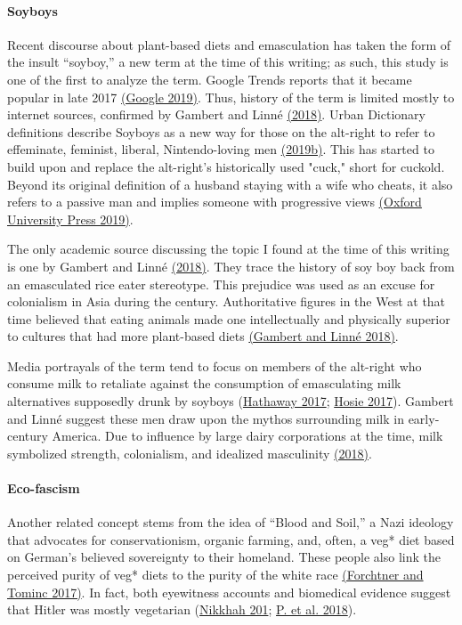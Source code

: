 \documentclass[twoside]{report}
\begin{document}
\paragraph{Soyboys}

Recent discourse about plant-based diets and emasculation has taken the
form of the insult ``soyboy,'' a new term at the time of this
writing; as such, this study is one of the first to analyze the term.
Google Trends reports that it became popular in late 2017 \hyperlink{google}{(Google 2019)}. Thus, history of the term is limited mostly to internet sources, confirmed by Gambert and Linné \hyperlink{gambert}{(2018)}. Urban Dictionary definitions describe Soyboys as a new way for those on the alt-right to refer to effeminate, feminist, liberal, Nintendo-loving men \hyperlink{2019b}{(2019b)}. This has
started to build upon and replace the alt-right's historically used
"cuck," short for cuckold. Beyond its original definition of a husband staying with a wife who cheats, it also refers to a passive man and implies someone
with progressive views \hyperlink{oxford}{(Oxford University Press 2019)}.

The only academic source discussing the topic I found at the time of
this writing is one by Gambert and Linné \hyperlink{gambert}{(2018)}. They trace the history of soy boy back from an emasculated rice eater stereotype. This prejudice was used as an excuse for colonialism in Asia during the  century. Authoritative figures in the West at that time believed that
eating animals made one intellectually and physically superior to
cultures that had more plant-based diets \hyperlink{gambert}{(Gambert and Linné 2018)}.

Media portrayals of the term tend to focus on members of the alt-right
who consume milk to retaliate against the consumption of emasculating
milk alternatives supposedly drunk by soyboys (\hyperlink{hathaway}{Hathaway 2017}; \hyperlink{hosie}{Hosie 2017}). Gambert and Linné suggest these men draw upon the mythos surrounding milk in early- century America. Due to influence by large dairy corporations at the time, milk symbolized strength, colonialism, and idealized masculinity \hyperlink{gambert}{(2018)}.

\paragraph{Eco-fascism}

Another related concept stems from the idea of ``Blood
and Soil,'' a Nazi ideology that advocates for conservationism,
organic farming, and, often, a veg* diet based on German's believed
sovereignty to their homeland. These people also
link the perceived purity of veg* diets to the purity of the white race
\hyperlink{forchtner}{(Forchtner and Tominc 2017)}. In fact, both eyewitness accounts and biomedical evidence suggest that Hitler was mostly vegetarian (\hyperlink{nikkhah}{Nikkhah 201}; \hyperlink{p}{P. et al. 2018}).
\end{document}
